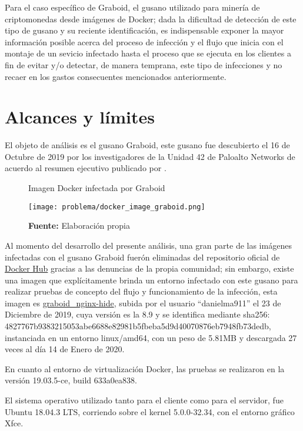 \documentclass[../main/main.tex]{subfiles}
\begin{document}
  Para el caso específico de Graboid, el gusano utilizado para minería de criptomonedas desde imágenes de Docker; dada la dificultad de detección de este tipo de gusano y su reciente identificación, es indispensable exponer la mayor información posible acerca del proceso de infección y el flujo que inicia con el montaje de un sevicio infectado hasta el proceso que se ejecuta en los clientes a fin de evitar y/o detectar, de manera temprana, este tipo de infecciones y no recaer en los gastos consecuentes mencionados anteriormente.

  \section{Alcances y límites}

  El objeto de análisis es el gusano Graboid, este gusano fue descubierto el 16 de Octubre de 2019 por los investigadores de la Unidad 42 de Paloalto Networks de acuerdo al resumen ejecutivo publicado por \cite{web:graboid_paloalto}.

  \begin{figure}[ht]
    \centering
    \caption{Imagen Docker infectada por Graboid}
    \texttt{[image: problema/docker\_image\_graboid.png]}
    \caption*{\textbf{Fuente:} Elaboración propia}
  \end{figure}

  Al momento del desarrollo del presente análisis, una gran parte de las imágenes infectadas con el gusano Graboid fuerón eliminadas del repositorio oficial de \href{https://hub.docker.com/}{Docker Hub} gracias a las denuncias de la propia comunidad; sin embargo, existe una imagen que explícitamente brinda un entorno infectado con este gusano para realizar pruebas de concepto del flujo y funcionamiento de la infección, esta imagen es \href{https://hub.docker.com/r/danielma911/graboid\_nginx-hide}{graboid\_nginx-hide}, subida por el usuario ``danielma911'' el 23 de Diciembre de 2019, cuya versión es la 8.9 y se identifica mediante sha256: 4827767b9383215053abe6688e82981b5fbeba5d9d40070876eb7948fb73dedb, instanciada en un entorno linux/amd64, con un peso de 5.81MB y descargada 27 veces al día 14 de Enero de 2020.

  En cuanto al entorno de virtualización Docker, las pruebas se realizaron en la versión 19.03.5-ce, build 633a0ea838.

  El sistema operativo utilizado tanto para el cliente como para el servidor, fue Ubuntu 18.04.3 LTS, corriendo sobre el kernel 5.0.0-32.34, con el entorno gráfico Xfce.
\end{document}
